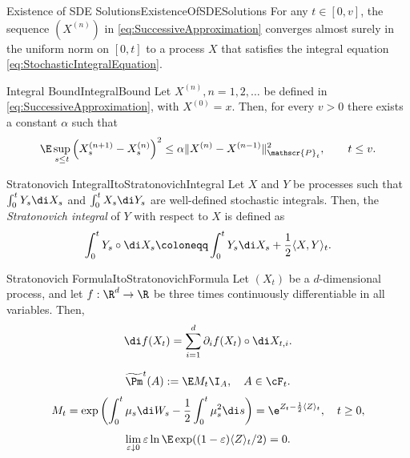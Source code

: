 \begin{thm}{Existence of SDE Solutions}{ExistenceOfSDESolutions}
	For any $t \in [0, v]$, the sequence $(X^{(n)})$ in \eqref{eq:SuccessiveApproximation} converges almost surely in the uniform norm on $[0, t]$ to a process $X$ that satisfies the integral equation \eqref{eq:StochasticIntegralEquation}.
\end{thm}

\begin{lem}{Integral Bound}{IntegralBound}
	Let $X^{(n)}, n = 1, 2, \dots$ be defined in \eqref{eq:SuccessiveApproximation}, with $X^{(0)} = x$. Then, for every $v > 0$ there exists a constant $\alpha$ such that
	\begin{equation*}
		\E \sup_{s \le t} \left( X_s^{(n+1)} - X_s^{(n)} \right)^2 \le \alpha \| X^{(n)} - X^{(n-1)} \|_{\mathscr{P}_t}^2, \qquad t \le v.
	\end{equation*}
\end{lem}

\begin{defn}{\Ito{} Stratonovich Integral}{ItoStratonovichIntegral}
	Let $X$ and $Y$ be \Ito{} processes such that $\int_0^t Y_s \di X_s$ and $\int_0^t X_s \di Y_s$ are well-defined stochastic integrals. Then, the \textit{\Ito{} Stratonovich integral} of $Y$ with respect to $X$ is defined as
	\begin{equation}
		\int_0^t Y_s \circ \di X_s \coloneqq \int_0^t Y_s \di X_s + \frac{1}{2}\langle X, Y \rangle_t.
		\label{eq:ItoStratonovichIntegral}
	\end{equation}
\end{defn}

\begin{prop}{\Ito \; Stratonovich Formula}{ItoStratonovichFormula}
	Let $(X_t)$ be a $d$-dimensional \Ito process, and let $f : \R^d \to \R$ be three times continuously differentiable in all variables. Then,
	\begin{equation}
		\di f(X_t) = \sum_{i=1}^d \partial_i f(X_t) \circ \di X_{t,i}.
		\label{eq:ItoStratonovichFormula}
	\end{equation}
\end{prop}
\begin{equation}\label{eq:ChangeOfMeasureDef}
	\widetilde{\Pm}^t(A) := \E M_t \I_A, \quad A \in \cF_t.
\end{equation}
\begin{equation}\label{eq:ExponentialMartingaleDef}
	M_t = \exp\left(\int_0^t \mu_s \di W_s - \frac{1}{2} \int_0^t \mu_s^2 \di s\right) = \e^{Z_t - \frac{1}{2}\langle Z \rangle_t}, \quad t \ge 0,
\end{equation}
\begin{equation}\label{eq:KrylovCondition}
	\lim_{\varepsilon \downarrow 0} \varepsilon \ln \E \exp((1 - \varepsilon)\langle Z \rangle_t / 2) = 0.
\end{equation}

